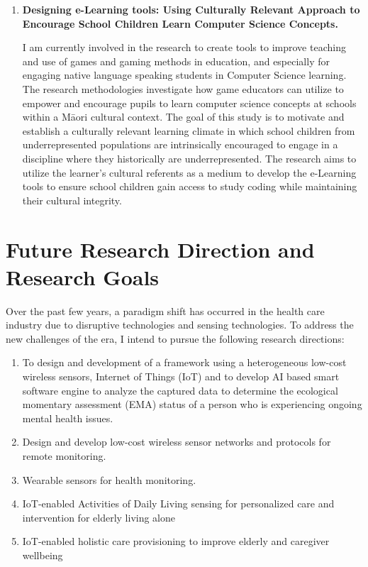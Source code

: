 \documentclass[11pt,a4paper,sans]{moderncv} %
\begin{document}
\begin{enumerate}
  \item \textbf{Designing e-Learning tools: Using Culturally Relevant Approach to Encourage School Children Learn Computer Science Concepts.} \par I am currently involved in the research to create tools to improve teaching and use of games and gaming methods in education, and especially for engaging native language speaking students in Computer Science learning. The research methodologies investigate how game educators can utilize to empower and encourage pupils to learn computer science concepts at schools within a M\={a}ori cultural context. The goal of this study is to motivate and establish a culturally relevant learning climate in which school children from underrepresented populations are intrinsically encouraged to engage in a discipline where they historically are underrepresented. The research aims to utilize the learner's cultural referents as a medium to develop the e-Learning tools to ensure school children gain access to study coding while maintaining their cultural integrity. 
\end{enumerate}
\section{ Future Research Direction and Research Goals}
Over the past few years, a paradigm shift has occurred in the health care industry due to disruptive technologies and sensing technologies. To address the new challenges of the era, I intend to pursue the following research directions: 
\begin{enumerate}
\item To design and development of a framework using a heterogeneous low-cost wireless sensors,  Internet of Things (IoT) and to develop AI based smart software engine to analyze the captured data to determine the ecological momentary assessment (EMA) status of a person who is experiencing ongoing mental health issues. 
\item Design and develop low-cost wireless sensor networks and protocols for remote monitoring.
\item Wearable sensors for health monitoring.
\item IoT-enabled Activities of Daily Living sensing for personalized care and intervention for elderly living alone
\item IoT-enabled holistic care provisioning to improve elderly and caregiver wellbeing
\end{enumerate}
\end{document}
